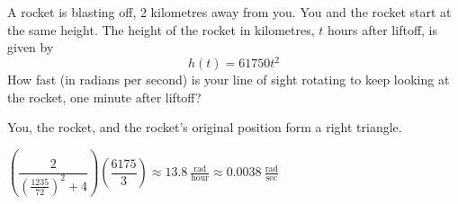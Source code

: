 \begin{question}
A rocket is blasting off, 2 kilometres away from you. You and the rocket start at the same height. The height of the rocket in kilometres, $t$ hours after liftoff, is given by
\[h(t)=61750t^2\]
How fast (in radians per second) is your line of sight rotating to keep looking at the rocket, one minute after liftoff?
\end{question}
\begin{hint}
You, the rocket, and the rocket's original position form a right triangle.
\end{hint}
\begin{answer}
$\left(\dfrac{2}{\left(\frac{1235}{72}\right)^2+4}\right)\left(\dfrac{6175}{3}\right)\approx
13.8~\frac{\mathrm{rad}}{\mathrm{hour}} \approx 0.0038~\frac{\mathrm{rad}}{\mathrm{sec}}$
\end{answer}
